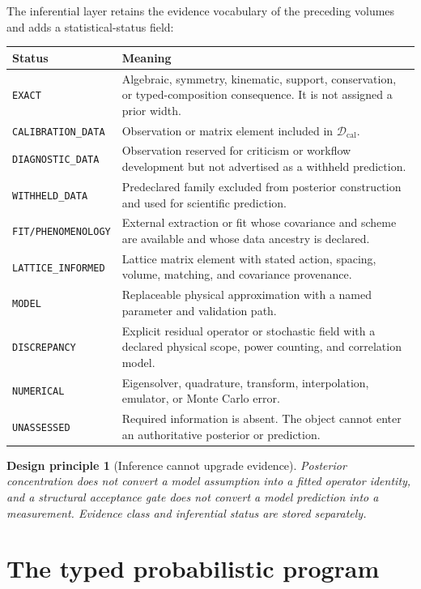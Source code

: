 \documentclass[11pt]{article}
\newtheorem{principle}[definition]{Design principle}
\newcommand{\caldata}{\mathcal D_{\mathrm{cal}}}
\begin{document}
The inferential layer retains the evidence vocabulary of the preceding
volumes and adds a statistical-status field:
\begin{longtable}{L{0.22\textwidth}L{0.69\textwidth}}
\toprule
Status & Meaning\\
\midrule
\endhead
\texttt{EXACT} & Algebraic, symmetry, kinematic, support, conservation, or
typed-composition consequence.  It is not assigned a prior width.\\
\texttt{CALIBRATION\_DATA} & Observation or matrix element included in
\(\caldata\).\\
\texttt{DIAGNOSTIC\_DATA} & Observation reserved for criticism or workflow
development but not advertised as a withheld prediction.\\
\texttt{WITHHELD\_DATA} & Predeclared family excluded from posterior
construction and used for scientific prediction.\\
\texttt{FIT/PHENOMENOLOGY} & External extraction or fit whose covariance and
scheme are available and whose data ancestry is declared.\\
\texttt{LATTICE\_INFORMED} & Lattice matrix element with stated action,
spacing, volume, matching, and covariance provenance.\\
\texttt{MODEL} & Replaceable physical approximation with a named parameter
and validation path.\\
\texttt{DISCREPANCY} & Explicit residual operator or stochastic field with a
declared physical scope, power counting, and correlation model.\\
\texttt{NUMERICAL} & Eigensolver, quadrature, transform, interpolation,
emulator, or Monte Carlo error.\\
\texttt{UNASSESSED} & Required information is absent.  The object cannot enter
an authoritative posterior or prediction.\\
\bottomrule
\end{longtable}

\begin{principle}[Inference cannot upgrade evidence]
Posterior concentration does not convert a model assumption into a fitted
operator identity, and a structural acceptance gate does not convert a model
prediction into a measurement.  Evidence class and inferential status are
stored separately.
\end{principle}

\section{The typed probabilistic program}
\label{sec:program}
\end{document}
